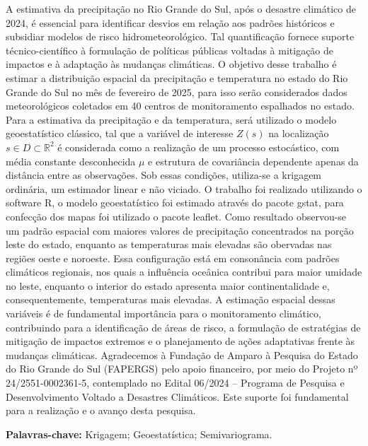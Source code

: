 \documentclass{2ssmeeting}
\begin{document}
A estimativa da precipitação no Rio Grande do Sul, após o desastre climático de 2024, é essencial para identificar desvios em relação aos padrões históricos e subsidiar modelos de risco hidrometeorológico. Tal quantificação fornece suporte técnico-científico à formulação de políticas públicas voltadas à mitigação de impactos e à adaptação às mudanças climáticas. O objetivo desse trabalho é estimar a distribuição espacial da precipitação e temperatura no estado do Rio Grande do Sul no mês de fevereiro de 2025, para isso serão considerados dados meteorológicos coletados em 40 centros de monitoramento espalhados no  estado. Para a estimativa da precipitação e da temperatura, será utilizado o modelo geoestatístico clássico, tal que a variável de interesse \( Z(s) \) na localização \( s \in D \subset \mathbb{R}^2 \) é considerada como a realização de um processo estocástico, com média constante desconhecida \( \mu \) e estrutura de covariância dependente apenas da distância entre as observações. Sob essas condições, utiliza-se a krigagem ordinária, um estimador linear e não viciado. O trabalho foi realizado utilizando o software R, o modelo geoestatístico foi estimado através do pacote  gstat, para confecção dos mapas foi utilizado o pacote leaflet. Como resultado observou-se um padrão espacial com maiores valores de precipitação concentrados na porção leste do estado, enquanto as temperaturas mais elevadas são obervadas nas regiões oeste e noroeste. Essa configuração está em consonância com padrões climáticos regionais, nos quais a influência oceânica contribui para maior umidade no leste, enquanto o interior do estado apresenta maior continentalidade e, consequentemente, temperaturas mais elevadas. A estimação espacial dessas variáveis é de fundamental importância para o monitoramento climático, contribuindo para a identificação de áreas de risco, a formulação de estratégias de mitigação de impactos extremos e o planejamento de ações adaptativas frente às mudanças climáticas. Agradecemos à Fundação de Amparo à Pesquisa do Estado do Rio Grande do Sul (FAPERGS) pelo apoio financeiro, por meio do Projeto nº 24/2551-0002361-5, contemplado no Edital 06/2024 – Programa de Pesquisa e Desenvolvimento Voltado a Desastres Climáticos. Este suporte foi fundamental para a realização e o avanço desta pesquisa.

\vspace{1.5em}
\vspace{1.5em}
\vspace{1.5em}


{\bf Palavras-chave:} Krigagem; Geoestatística; Semivariograma.
\end{document}

